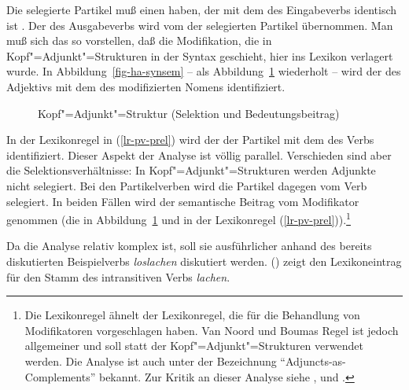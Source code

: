 Die selegierte Partikel muß einen \modw haben, der mit dem \synsemw des Eingabeverbs
identisch ist . Der \contw des Ausgabeverbs wird vom \contw der selegierten
Partikel  übernommen. Man muß sich das so vorstellen, daß die Modifikation,
die in Kopf"=Adjunkt"=Strukturen in der Syntax geschieht, hier ins Lexikon verlagert wurde.
In Abbildung~\vref{fig-ha-synsem} --  als Abbildung~\ref{fig-ha-synsem-zwei} wiederholt --
wird der \modw des Adjektivs mit dem \synsemw des modifizierten Nomens identifiziert. 
\begin{figure}
\caption{\label{fig-ha-synsem-zwei}Kopf"=Adjunkt"=Struktur (Selektion und Bedeutungsbeitrag)}
\end{figure}
In der Lexikonregel in (\ref{lr-pv-prel}) wird der \modw der Partikel mit dem
\synsemw des Verbs identifiziert. Dieser Aspekt der Analyse ist völlig parallel. Verschieden
sind aber die Selektionsverhältnisse: In Kopf"=Adjunkt"=Strukturen werden Adjunkte nicht selegiert.
Bei den Partikelverben wird die Partikel dagegen vom Verb selegiert. In beiden Fällen wird
der semantische Beitrag vom Modifikator genommen (die  in Abbildung~\ref{fig-ha-synsem-zwei}
und  in der Lexikonregel (\ref{lr-pv-prel})).\footnote{
  Die Lexikonregel ähnelt der Lexikonregel, die \citet{NB94} für die Behandlung von Modifikatoren
  vorgeschlagen haben. Van Noord und Boumas Regel ist jedoch allgemeiner und soll statt
  der Kopf"=Adjunkt"=Strukturen verwendet werden. Die Analyse ist auch unter der Bezeichnung
  "`Adjuncts-as-Complements"' bekannt. Zur Kritik an dieser Analyse siehe
  ,  und .%
}

Da die Analyse relativ komplex ist, soll sie ausführlicher anhand des bereits diskutierten
Beispielverbs \emph{loslachen} diskutiert werden. () zeigt den Lexikoneintrag
für den Stamm des intransitiven Verbs \emph{lachen}.

